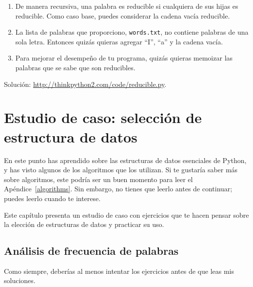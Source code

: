 \documentclass[10pt]{book}
\begin{document}
\begin{exercise}
\begin{enumerate}
\item De manera recursiva, una palabra es reducible si cualquiera de sus hijas
es reducible.  Como caso base, puedes considerar la cadena vacía
reducible.

\item La lista de palabras que proporciono, {\tt words.txt}, no
contiene palabras de una sola letra.  Entonces quizás quieras agregar
``I'', ``a'' y la cadena vacía.

\item Para mejorar el desempeño de tu programa, quizás quieras
memoizar las palabras que se sabe que son reducibles.

\end{enumerate}

Solución: \url{http://thinkpython2.com/code/reducible.py}.

\end{exercise}








\chapter{Estudio de caso: selección de estructura de datos}

En este punto has aprendido sobre las estructuras de datos esenciales de Python,
y has visto algunos de los algoritmos que los utilizan.
Si te gustaría saber más sobre algoritmos, este podría ser un buen
momento para leer el Apéndice~\ref{algorithms}.
Sin embargo, no tienes que leerlo antes de continuar; puedes leerlo
cuando te interese.

Este capítulo presenta un estudio de caso con ejercicios que te hacen
pensar sobre la elección de estructuras de datos y practicar su uso.


\section{Análisis de frecuencia de palabras}
\label{analysis}

Como siempre, deberías al menos intentar los ejercicios
antes de que leas mis soluciones.
\end{document}
